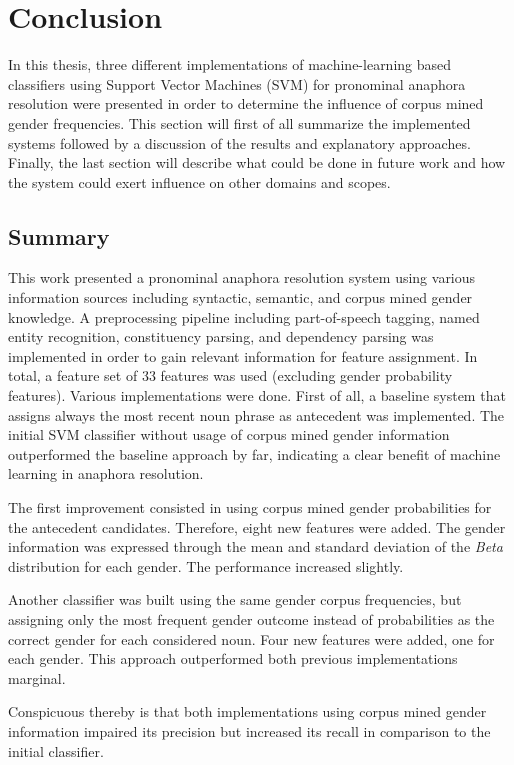 \chapter{Conclusion}
\label{sec:Conclusion}
In this thesis, three different implementations of machine-learning based classifiers using Support Vector Machines (SVM) for pronominal anaphora resolution were presented in order to determine the influence of corpus mined gender frequencies. This section will first of all summarize the implemented systems followed by a discussion of the results and explanatory approaches. Finally, the last section will describe what could be done in future work and how the system could exert influence on other domains and scopes.

\section{Summary}
This work presented a pronominal anaphora resolution system using various information sources including syntactic, semantic, and corpus mined gender knowledge. A preprocessing pipeline including part-of-speech tagging, named entity recognition, constituency parsing, and dependency parsing was implemented in order to gain relevant information for feature assignment. In total, a feature set of 33 features was used (excluding gender probability features). Various implementations were done. First of all, a baseline system that assigns always the most recent noun phrase as antecedent was implemented. The initial SVM classifier without usage of corpus mined gender information outperformed the baseline approach by far, indicating a clear benefit of machine learning in anaphora resolution. 

The first improvement consisted in using corpus mined gender probabilities for the antecedent candidates. Therefore, eight new features were added. The gender information was expressed through the mean and standard deviation of the \textit{Beta} distribution for each gender. The performance increased slightly. 

Another classifier was built using the same gender corpus frequencies, but assigning only the most frequent gender outcome instead of probabilities as the correct gender for each considered noun. Four new features were added, one for each gender. This approach outperformed both previous implementations marginal.

Conspicuous thereby is that both implementations using corpus mined gender information impaired its precision but increased its recall in comparison to the initial classifier. 

